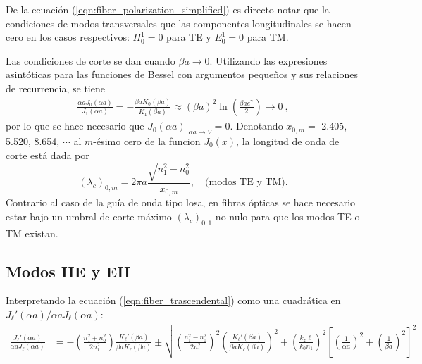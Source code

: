 De la ecuación (\ref{eqn:fiber_polarization_simplified}) es directo notar que la condiciones de modos transversales que las componentes longitudinales se hacen cero en los casos respectivos: $H_0^1 = 0$ para TE y $E_0^1 = 0$ para TM.

Las condiciones de corte se dan cuando $\beta a \to 0$. Utilizando las expresiones asintóticas para las funciones de Bessel con argumentos pequeños y sus relaciones de recurrencia, se tiene
\begin{align*}
	\frac{\alpha a J_0(\alpha a)}{J_1(\alpha a)}  = -\frac{\beta a K_{0}(\beta a)} {K_1(\beta a)} \approx (\beta a)^2\ln\left(\frac{\beta a e^\gamma}{2}\right) \to 0 \ ,
\end{align*}
por lo que se hace necesario que $\left. J_0(\alpha a)\right|_{\alpha a \to V} = 0$. Denotando $x_{0,m}=$ 2.405,  5.520,  8.654, $\cdots$ al $m$-ésimo cero de la funcion $J_0(x)$, la longitud de onda de corte está dada por 
\begin{equation}
(\lambda_c)_{0,m} = 2\pi a \frac{\sqrt{n_1^2 - n_0^2}}{x_{0,m}}, \quad\text{(modos TE y TM).}
\end{equation} 
Contrario al caso de la guía de onda tipo losa, en fibras ópticas se hace necesario estar bajo un umbral de corte máximo $(\lambda_c)_{0,1}$ no nulo para que los modos TE o TM existan.


\subsection{Modos HE y EH}
Interpretando la ecuación (\ref{eqn:fiber_trascendental}) como una cuadrática en $J_\ell'(\alpha a)/\alpha a J_\ell(\alpha a)$:
\begin{align*}
	\frac{J_\ell'(\alpha a)}{\alpha a J_\ell(\alpha a)} &= -\left(\frac{n_1^2+n_0^2}{2n_1^2}\right) \frac{K_\ell'(\beta a)}{\beta a K_\ell(\beta a)}\pm\sqrt{\left(\frac{n_1^2-n_0^2}{2n_1^2}\right)^2\left(\frac{K_\ell'(\beta a)}{\beta a K_\ell(\beta a)}\right)^2+ \left( \frac{ k_z \ell}{ k_0 n_1} \right)^2\left[ \left(\frac{1}{\alpha a}\right)^2 + \left(\frac{1}{\beta a}\right)^2 \right]^2 }
\end{align*}

